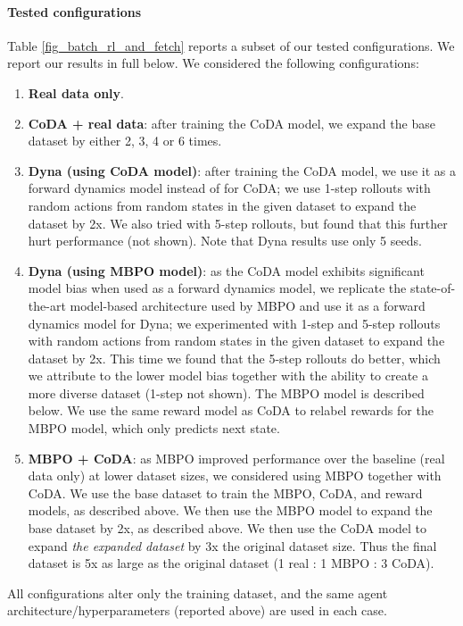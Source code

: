 \documentclass[coda.tex]{subfiles}
\begin{document}
\paragraph{Tested configurations}

Table \ref{fig_batch_rl_and_fetch} reports a subset of our tested configurations. We report our results in full below. We considered the following configurations:
\begin{enumerate}
    \item \textbf{Real data only}.
    \item \textbf{CoDA + real data}: after training the CoDA model, we expand the base dataset by either 2, 3, 4 or 6 times.
    \item \textbf{Dyna (using CoDA model)}: after training the CoDA model, we use it as a forward dynamics model instead of for CoDA; we use 1-step rollouts with random actions from random states in the given dataset to expand the dataset by 2x. We also tried with 5-step rollouts, but found that this further hurt performance (not shown).  Note that Dyna results use only 5 seeds.
    \item \textbf{Dyna (using MBPO model)}: as the CoDA model exhibits significant model bias when used as a forward dynamics model, we replicate the state-of-the-art model-based architecture used by MBPO \cite{janner2019trust} and use it as a forward dynamics model for Dyna; we experimented with 1-step and 5-step rollouts with random actions from random states in the given dataset to expand the dataset by 2x. This time we found that the 5-step rollouts do better, which we attribute to the lower model bias together with the ability to create a more diverse dataset (1-step not shown). The MBPO model is described below. We use the same reward model as CoDA to relabel rewards for the MBPO model, which only predicts next state. 
    \item \textbf{MBPO + CoDA}: as MBPO improved performance over the baseline (real data only) at lower dataset sizes, we considered using MBPO together with CoDA. We use the base dataset to train the MBPO, CoDA, and reward models, as described above. We then use the MBPO model to expand the base dataset by 2x, as described above. We then use the CoDA model to expand \textit{the expanded dataset} by 3x the original dataset size. Thus the final dataset is 5x as large as the original dataset (1 real : 1 MBPO : 3 CoDA). 
\end{enumerate}

All configurations alter only the training dataset, and the same agent architecture/hyperparameters (reported above) are used in each case. 
\end{document}

